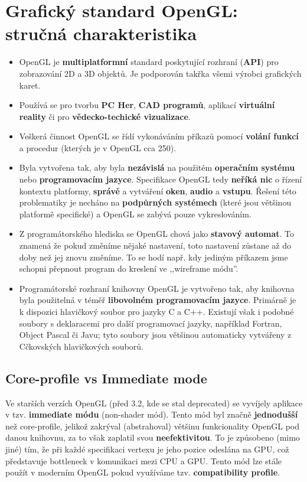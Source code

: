 \section{Grafický standard OpenGL: stručná charakteristika}
\begin{itemize}
    \item OpenGL je \textbf{multiplatformní} standard poskytující rozhraní (\textbf{API}) pro zobrazování 2D a 3D objektů. Je podporován takřka všemi výrobci grafických karet.
    \item Používá se pro tvorbu \textbf{PC Her}, \textbf{CAD programů}, aplikací \textbf{virtuální reality} či pro  \textbf{vědecko-techické vizualizace}.
    \item Veškerá činnost OpenGL se řídí vykonáváním příkazů pomocí \textbf{volání funkcí} a procedur (kterých je v OpenGL cca 250).
    \item Byla vytvořena tak, aby byla \textbf{nezávislá} na použitém \textbf{operačním systému} nebo \textbf{programovacím jazyce}. Specifikace OpenGL tedy \textbf{neříká nic} o řízení kontextu platformy, \textbf{správě} a vytváření \textbf{oken}, \textbf{audio} a \textbf{vstupu}. Řešení této problematiky je necháno na \textbf{podpůrných systémech} (které jsou většinou platformě specifické) a OpenGL se zabývá pouze vykreslováním.
    \item Z programátorského hlediska se OpenGL chová jako \textbf{stavový automat}. To znamená že pokud změníme nějaké nastavení, toto nastavení zůstane až do doby než jej znovu změníme. To se hodí např. kdy jediným příkazem jsme schopni přepnout program do kreslení ve ,,wireframe módu''.
    \item Programátorské rozhraní knihovny OpenGL je vytvořeno tak, aby knihovna byla použitelná v téměř \textbf{libovolném programovacím jazyce}. Primárně je k dispozici hlavičkový soubor pro jazyky C a C++. Existují však i podobné soubory s deklaracemi pro další programovací jazyky, například Fortran, Object Pascal či Javu; tyto soubory jsou většinou automaticky vytvářeny z Cčkovských hlavičkových souborů.
\end{itemize}

\subsection{Core-profile vs Immediate mode}
Ve starších verzích OpenGL (před 3.2, kde se stal deprecated) se vyvíjely aplikace v tzv. \textbf{immediate módu} (non-shader mód). Tento mód byl značně \textbf{jednodušší} než core-profile, jelikož zakrýval (abstrahoval) většinu funkcionality OpenGL pod danou knihovnu, za to však zaplatil svou \textbf{neefektivitou}. To je způsobeno (mimo jiné) tím, že při každé specifikaci vertexu je jeho pozice odeslána na GPU, což představuje bottleneck v komunikaci mezi CPU a GPU. Tento mód lze stále použít v moderním OpenGL pokud využíváme tzv. \textbf{compatibility profile}.

